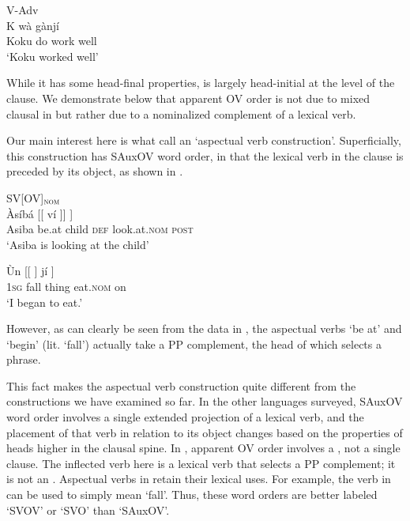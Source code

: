 \documentclass[output=paper]{LSP/langsci}
\begin{document}
\ea \label{ex:Fongbe-Adv}
{V-Adv}\\
\gll K w\`a  g\`anj\'i \\
Koku do work well \\
\glt `Koku worked well' \hfill \citep[][381]{lefebvre2002}
\z

While it has some head-final properties,  is largely head-initial at the level of the clause. We demonstrate below that apparent OV order is not due to mixed clausal  in  but rather due to a nominalized complement of a lexical verb.

Our main interest here is what \citet{lefebvre2002} call an `aspectual verb construction'. Superficially, this construction has SAuxOV word order, in that the lexical verb in the clause is preceded by its object, as shown in . 


\ea \label{ex:Fongbe-SVOV} {SV[OV]$_{\textsc{nom}}$}\\
\ea \gll \`As\'ib\'a  [[ v\'i   ]]  ]  \\
Asiba be.at {} child \textsc{def} look.at.\textsc{nom} {} \textsc{post}  \\
\glt `Asiba is looking at the child' \hfill \citep[][215]{lefebvre2002}

\ex \label{ex:Fongbe-SVOVa} \gll \`Un  [[    ] j\'i ]  \\
1\textsc{sg} fall {} thing eat.\textsc{nom} {} on  \\
\glt `I began to eat.' \hfill \citep[][215]{lefebvre2002}
\z
\z

However, as can clearly be seen from the data in , the aspectual verbs  `be at' and  `begin' (lit. `fall') actually take a PP complement, the head of which selects a  phrase. 

This fact makes the  aspectual verb construction quite different from the constructions we have examined so far. In the other languages surveyed, SAuxOV word order involves a single extended projection of a lexical verb, and the placement of that verb in relation to its object changes based on the properties of heads higher in the clausal spine. In , apparent OV order involves a , not a single clause. The inflected verb here is a lexical verb that selects a PP complement; it is not an . Aspectual verbs in  retain their lexical uses. For example, the verb \textit{} in  can be used to simply mean `fall'. Thus, these word orders are better labeled `SVOV' or `SVO' than `SAuxOV'.
\end{document}
